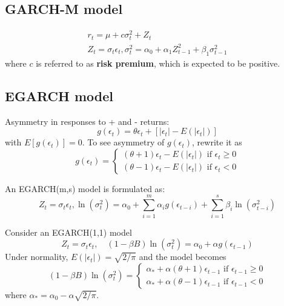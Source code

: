 \documentclass{article}
\begin{document}
\subsection{GARCH-M model}
\begin{equation*}
\begin{array}{c}{r_{t}=\mu+c \sigma_{t}^{2}+Z_{t}} \\ {Z_{t}=\sigma_{t} \epsilon_{t}, \sigma_{t}^{2}=\alpha_{0}+\alpha_{1} Z_{t-1}^{2}+\beta_{1} \sigma_{t-1}^{2}}\end{array}
\end{equation*}
where $c$ is referred to as \textbf{risk premium}, which is expected to be positive.

\subsection{EGARCH model}
Asymmetry in responses to + and - returns:
\begin{equation*}
g\left(\epsilon_{t}\right)=\theta \epsilon_{t}+\left[\left|\epsilon_{t}\right|-E\left(\left|\epsilon_{t}\right|\right)\right]
\end{equation*}
with $E\left[g\left(\epsilon_{t}\right)\right]=0$. To see asymmetry of $g\left(\epsilon_{t}\right)$, rewrite it as
\begin{equation*}
g\left(\epsilon_{t}\right)=\left\{\begin{array}{l}{(\theta+1) \epsilon_{t}-E\left(\left|\epsilon_{t}\right|\right) \text { if } \epsilon_{t} \geq 0} \\ {(\theta-1) \epsilon_{t}-E\left(\left|\epsilon_{t}\right|\right) \text { if } \epsilon_{t}<0}\end{array}\right.
\end{equation*}

\noindent An EGARCH(m,s) model is formulated as:
\begin{equation*}
Z_{t}=\sigma_{t} \epsilon_{t}, \ln \left(\sigma_{t}^{2}\right)=\alpha_{0}+\sum_{i=1}^{m} \alpha_{i} g\left(\epsilon_{t-i}\right)+\sum_{i=1}^{s} \beta_{i} \ln \left(\sigma_{t-i}^{2}\right)
\end{equation*}

\noindent Consider an EGARCH(1,1) model
\begin{equation*}
Z_{t}=\sigma_{t} \epsilon_{t}, \quad(1-\beta B) \ln \left(\sigma_{t}^{2}\right)=\alpha_{0}+\alpha g\left(\epsilon_{t-1}\right)
\end{equation*}
Under normality, $E\left(\left|\epsilon_{t}\right|\right)=\sqrt{2 / \pi}$ and the model becomes
\begin{equation*}
(1-\beta B) \ln \left(\sigma_{t}^{2}\right)=\left\{\begin{array}{l}{\alpha_{*}+\alpha(\theta+1) \epsilon_{t-1} \text { if } \epsilon_{t-1} \geq 0} \\ {\alpha_{*}+\alpha(\theta-1) \epsilon_{t-1} \text { if } \epsilon_{t-1}<0}\end{array}\right.
\end{equation*}
where $\alpha_{*}=\alpha_{0}-\alpha \sqrt{2 / \pi}$.
\end{document}
